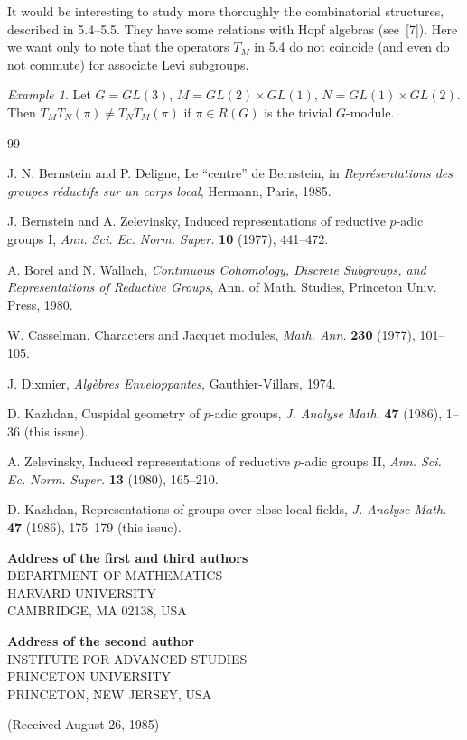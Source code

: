 \documentclass[12pt,a4paper]{article}
\theoremstyle{plain}
\theoremstyle{definition}
\theoremstyle{remark}
\newtheorem{example}{Example}
\begin{document}
It would be interesting to study more thoroughly the combinatorial structures, described in 5.4--5.5. They have some relations with Hopf algebras (see~[7]). Here we want only to note that the operators $T_M$ in 5.4 do not coincide (and even do not commute) for associate Levi subgroups.

\begin{example}
Let $G = GL(3)$, $M = GL(2) \times GL(1)$, $N = GL(1) \times GL(2)$. Then $T_M T_N(\pi) \neq T_N T_M(\pi)$ if $\pi \in R(G)$ is the trivial $G$-module.
\end{example}

\begin{thebibliography}{99}

 J. N. Bernstein and P. Deligne, Le ``centre'' de Bernstein, in \textit{Repr\'{e}sentations des groupes r\'{e}ductifs sur un corps local}, Hermann, Paris, 1985.

 J. Bernstein and A. Zelevinsky, Induced representations of reductive $p$-adic groups I, \textit{Ann. Sci. Ec. Norm. Super.} \textbf{10} (1977), 441--472.

 A. Borel and N. Wallach, \textit{Continuous Cohomology, Discrete Subgroups, and Representations of Reductive Groups}, Ann. of Math. Studies, Princeton Univ. Press, 1980.

 W. Casselman, Characters and Jacquet modules, \textit{Math. Ann.} \textbf{230} (1977), 101--105.

 J. Dixmier, \textit{Alg\`{e}bres Enveloppantes}, Gauthier-Villars, 1974.

 D. Kazhdan, Cuspidal geometry of $p$-adic groups, \textit{J. Analyse Math.} \textbf{47} (1986), 1--36 (this issue).

 A. Zelevinsky, Induced representations of reductive $p$-adic groups II, \textit{Ann. Sci. Ec. Norm. Super.} \textbf{13} (1980), 165--210.

 D. Kazhdan, Representations of groups over close local fields, \textit{J. Analyse Math.} \textbf{47} (1986), 175--179 (this issue).

\end{thebibliography}

\vspace{5mm}

\noindent\textbf{Address of the first and third authors}\\
DEPARTMENT OF MATHEMATICS\\
HARVARD UNIVERSITY\\
CAMBRIDGE, MA 02138, USA

\vspace{3mm}

\noindent\textbf{Address of the second author}\\
INSTITUTE FOR ADVANCED STUDIES\\
PRINCETON UNIVERSITY\\
PRINCETON, NEW JERSEY, USA

\vspace{5mm}

\noindent (Received August 26, 1985)
\end{document}
